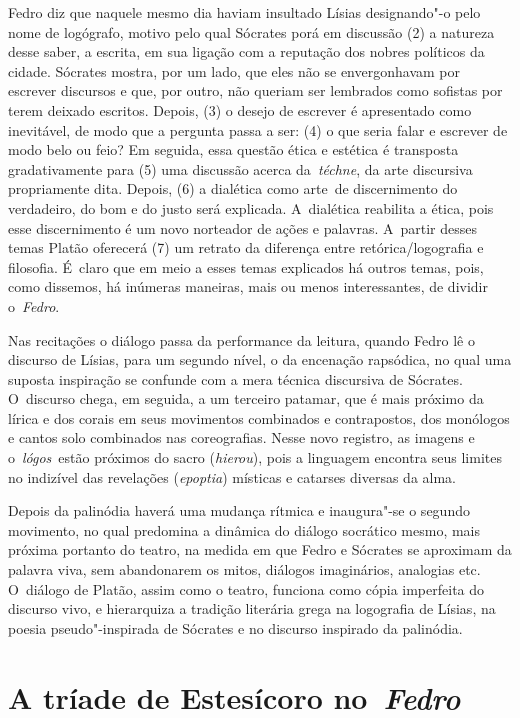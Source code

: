 Fedro diz que naquele mesmo dia haviam insultado Lísias designando"-o
pelo nome de logógrafo, motivo pelo qual Sócrates porá em discussão (2)
a natureza desse saber, a escrita, em sua ligação com a reputação dos
nobres políticos da cidade. Sócrates mostra, por um lado, que eles não
se envergonhavam por escrever discursos e que, por outro, não queriam
ser lembrados como sofistas por terem deixado escritos. Depois, (3) o
desejo de escrever é apresentado como inevitável, de modo que a pergunta
passa a ser: (4) o que seria falar e escrever de modo belo ou feio? Em
seguida, essa questão ética e estética é transposta gradativamente para
(5) uma discussão acerca da~\emph{téchne}, da arte discursiva
propriamente dita. Depois, (6) a dialética como arte~de
discernimento do verdadeiro, do bom e do justo será explicada. 
A~dialética reabilita a ética, pois esse discernimento é um novo norteador
de ações e palavras. A~partir desses temas Platão oferecerá (7) um
retrato da diferença entre retórica/\allowbreak{}logografia e filosofia. É~claro que
em meio a esses temas explicados há outros temas, pois, como dissemos,
há inúmeras maneiras, mais ou menos interessantes, de dividir
o~\emph{Fedro}.

Nas recitações o diálogo passa da performance da leitura, quando Fedro
lê o discurso de Lísias, para um segundo nível, o da encenação
rapsódica, no qual uma suposta inspiração se confunde com a mera técnica
discursiva de Sócrates. O~discurso chega, em seguida, a um terceiro
patamar, que é mais próximo da lírica e dos corais em seus movimentos
combinados e contrapostos, dos monólogos e cantos solo combinados nas
coreografias. Nesse novo registro, as imagens e o~\emph{lógos}~estão
próximos do sacro (\emph{hierou}), pois a linguagem encontra seus
limites no indizível das revelações (\emph{epoptia}) místicas e catarses
diversas da alma.

Depois da palinódia haverá uma mudança rítmica e inaugura"-se o segundo
movimento, no qual predomina a dinâmica do diálogo socrático mesmo, mais
próxima portanto do teatro, na medida em que Fedro e Sócrates se
aproximam da palavra viva, sem abandonarem os mitos, diálogos
imaginários, analogias etc. O~diálogo de Platão, assim como o teatro,
funciona como cópia imperfeita do discurso vivo, e hierarquiza a
tradição literária grega na logografia de Lísias, na poesia
pseudo"-inspirada de Sócrates e no discurso inspirado da palinódia.

 

\section{A tríade de Estesícoro no~\emph{Fedro}}

